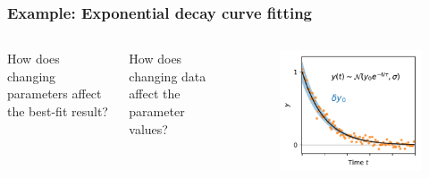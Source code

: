 \documentclass[xcolor={dvipsnames}]{beamer}
\begin{document}
\begin{frame}
\frametitle{Example: Exponential decay curve fitting}
\begin{columns}
        \begin{block}{}
        How does changing parameters affect the best-fit result?
        \end{block}
        \begin{block}{}
        How does changing data affect the parameter values?
        \end{block}

    \begin{figure}
        \includegraphics[width=\textwidth]{figs/dA.pdf}
    \end{figure}

\end{columns}
\end{frame}
\end{document}
